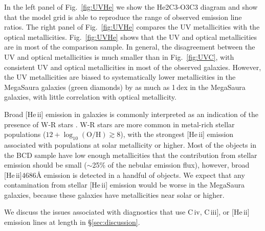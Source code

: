 \documentclass[preprint2]{aastex62}
\newcommand{\heii}{[He\,{\sc ii}]\xspace}
\newcommand{\civ}{C\,{\sc iv}\xspace}
\newcommand{\ciii}{C\,{\sc iii}]\xspace}
\newcommand{\logten}{\ensuremath{\log_{10}}}
\newcommand{\logOH}{\ensuremath{\logten (\mathrm{O}/\mathrm{H})}\xspace}
\newcommand{\ang}{\ensuremath{\mbox{\AA}}\xspace}
\newcommand{\mage}{{\sc Meg}a{\sc S}a{\sc ura}\xspace}
\begin{document}
In the left panel of Fig.~\ref{fig:UVHe} we show the He2C3-O3C3 diagram and show that the model grid is able to reproduce the range of observed emission line ratios. The right panel of Fig.~\ref{fig:UVHe} compares the UV metallicities with the optical metallicities. Fig.~\ref{fig:UVHe} shows that the UV and optical metallicities are in most of the comparison sample. In general, the disagreement between the UV and optical metallicities is much smaller than in Fig.~\ref{fig:UVC}, with consistent UV and optical metallicities in most of the observed galaxies. However, the UV metallicities are biased to systematically lower metallicities in the \mage galaxies (green diamonds) by as much as 1\,dex in the \mage galaxies, with little correlation with optical metallicity.

Broad \heii emission in galaxies is commonly interpreted as an indication of the presence of W-R stars \citep[e.g., ][]{Kunth+1985,Conti+1991, Schaerer+1999, Brinchmann+2008}. W-R stars are more common in metal-rich stellar populations ($12+\logOH \gtrsim 8$), with the strongest \heii emission associated with populations at solar metallicity or higher. Most of the objects in the \citet{Berg+2016} BCD sample have low enough metallicities that the contribution from stellar emission should be small (${\sim}$25\% of the nebular emission flux), however, broad \heii$4686\ang$ emission is detected in a handful of objects. We expect that any contamination from stellar \heii emission would be worse in the \mage galaxies, because these galaxies have metallicities near solar or higher.

We discuss the issues associated with diagnostics that use \civ, \ciii, or \heii emission lines at length in \S\ref{sec:discussion}.
\end{document}
